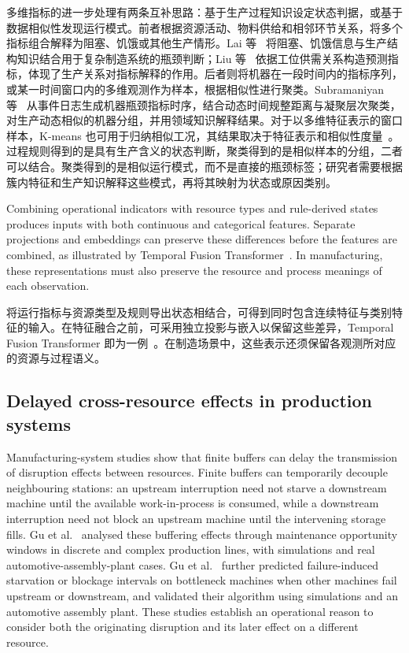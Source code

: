 \documentclass[a4paper,fleqn]{cas-dc}
\newcommand{\zhpara}[1]{%
  \par\begingroup\small\color{black!72}\noindent #1\par\endgroup}
\begin{document}
\zhpara{多维指标的进一步处理有两条互补思路：基于生产过程知识设定状态判据，或基于数据相似性发现运行模式。前者根据资源活动、物料供给和相邻环节关系，将多个指标组合解释为阻塞、饥饿或其他生产情形。Lai 等~\cite{lai2021data} 将阻塞、饥饿信息与生产结构知识结合用于复杂制造系统的瓶颈判断；Liu 等~\cite{liu2023lstmdam} 依据工位供需关系构造预测指标，体现了生产关系对指标解释的作用。后者则将机器在一段时间内的指标序列，或某一时间窗口内的多维观测作为样本，根据相似性进行聚类。Subramaniyan 等~\cite{subramaniyan2020clustering} 从事件日志生成机器瓶颈指标时序，结合动态时间规整距离与凝聚层次聚类，对生产动态相似的机器分组，并用领域知识解释结果。对于以多维特征表示的窗口样本，K-means 也可用于归纳相似工况，其结果取决于特征表示和相似性度量~\cite{jain2010clustering}。过程规则得到的是具有生产含义的状态判断，聚类得到的是相似样本的分组，二者可以结合。聚类得到的是相似运行模式，而不是直接的瓶颈标签；研究者需要根据簇内特征和生产知识解释这些模式，再将其映射为状态或原因类别。}


Combining operational indicators with resource types and rule-derived states produces inputs with both continuous and categorical features. Separate projections and embeddings can preserve these differences before the features are combined, as illustrated by Temporal Fusion Transformer~\cite{lim2021tft}. In manufacturing, these representations must also preserve the resource and process meanings of each observation.

\zhpara{将运行指标与资源类型及规则导出状态相结合，可得到同时包含连续特征与类别特征的输入。在特征融合之前，可采用独立投影与嵌入以保留这些差异，Temporal Fusion Transformer 即为一例~\cite{lim2021tft}。在制造场景中，这些表示还须保留各观测所对应的资源与过程语义。}


\subsection{Delayed cross-resource effects in production systems}\label{sec:manufacturing-delay}

Manufacturing-system studies show that finite buffers can delay the transmission of disruption effects between resources. Finite buffers can temporarily decouple neighbouring stations: an upstream interruption need not starve a downstream machine until the available work-in-process is consumed, while a downstream interruption need not block an upstream machine until the intervening storage fills. Gu et al.~\cite{gu2013hidden} analysed these buffering effects through maintenance opportunity windows in discrete and complex production lines, with simulations and real automotive-assembly-plant cases. Gu et al.~\cite{gu2015passive} further predicted failure-induced starvation or blockage intervals on bottleneck machines when other machines fail upstream or downstream, and validated their algorithm using simulations and an automotive assembly plant. These studies establish an operational reason to consider both the originating disruption and its later effect on a different resource.
\end{document}
